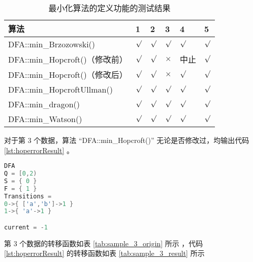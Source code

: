 \begin{table}[!htbp]
    \caption{ 最小化算法的定义功能的测试结果 }
    \label{tab:MinResult}
    \centering
    \small%
    \setlength{\tabcolsep}{4pt}%
    \renewcommand{\arraystretch}{1.2}%
    \begin{tabular}{l| p{3em}<{\centering} p{3em}<{\centering} p{3em}<{\centering} p{3em}<{\centering} p{3em}<{\centering} }  %
        \toprule %
        算法 & 1 & 2 & 3 & 4 &  5  \\
        \midrule
        DFA::min\_Brzozowski()        & $\surd$ & $\surd$ & $\surd$   & $\surd$     & $\surd$       \\
        DFA::min\_Hopcroft()（修改前） & $\surd$ & $\surd$ & $\times$  & 中止        & $\surd$       \\
        DFA::min\_Hopcroft()（修改后） & $\surd$ & $\surd$ & $\times$  & $\surd$     & $\surd$       \\
        DFA::min\_HopcroftUllman()    & $\surd$ & $\surd$ & $\surd$   & $\surd$     & $\surd$       \\
        DFA::min\_dragon()            & $\surd$ & $\surd$ & $\surd$   & $\surd$     & $\surd$       \\
        DFA::min\_Watson()            & $\surd$ & $\surd$ & $\surd$   & $\surd$     & $\surd$       \\
        \bottomrule%
    \end{tabular}
\end{table}

对于第 3 个数据，算法 “DFA::min\_Hopcroft()” 无论是否修改过，均输出代码 \ref{lst:hoperrorResult} 。
\lstset{style=mystyle}
\begin{lstlisting}[language=C++,label={lst:hoperrorResult},caption={ 第 3 个数据在算法 “DFA::min\_Hopcroft()” 中的输出 }]
DFA
Q = [0,2)
S = { 0 }
F = { 1 }
Transitions =
0->{ ['a','b']->1 }
1->{ 'a'->1 }

current = -1
\end{lstlisting}

第 3 个数据的转移函数如表 \ref{tab:sample_3_origin} 所示 ，代码 \ref{lst:hoperrorResult} 的转移函数如表 \ref{tab:sample_3_result} 所示 


